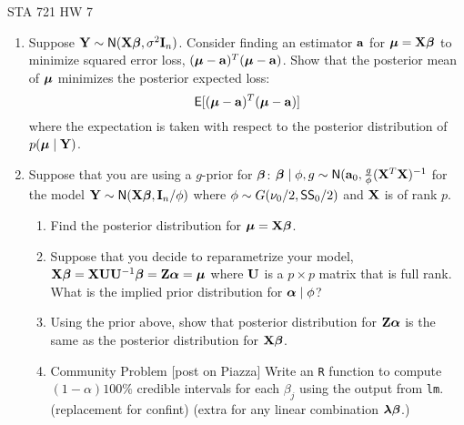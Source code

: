\documentclass{article}
\begin{document}
\begin{center}
  STA 721 HW 7
\end{center}


\begin{enumerate}
\item Suppose $\mathbf{Y} \sim \textsf{N}(\mathbf{X}\boldsymbol{\beta}, \sigma^2 \mathbf{I}_n)$.  Consider finding  an
  estimator $\mathbf{a}$ for $\boldsymbol{\mu} = \mathbf{X}\boldsymbol{\beta}$ to minimize 
  squared error loss, $(\boldsymbol{\mu}- \mathbf{a})^T(\boldsymbol{\mu} - \mathbf{a})$.   Show that the posterior
  mean of $\boldsymbol{\mu}$ minimizes the posterior expected loss:
$$\textsf{E}[(\boldsymbol{\mu}- \mathbf{a})^T(\boldsymbol{\mu} - \mathbf{a})]$$ where the expectation is taken with
respect to the posterior distribution of $p(\boldsymbol{\mu} \mid \mathbf{Y})$.  


\item Suppose that you are using a $g$-prior  for $\boldsymbol{\beta}$:  $\boldsymbol{\beta} \mid
  \phi, g \sim \textsf{N}(\mathbf{a}_0, \frac{g}{\phi} (\mathbf{X}^T\mathbf{X})^{-1}$ for the model
$\mathbf{Y} \sim \textsf{N}(\mathbf{X}\boldsymbol{\beta}, \mathbf{I}_n/\phi)$ where $\phi \sim G(\nu_0/2, \textsf{SS}_0/2)$
and $\mathbf{X}$ is of rank $p$.

\begin{enumerate}
\item  Find the posterior distribution for $\boldsymbol{\mu} = \mathbf{X}\boldsymbol{\beta}$.
\item  Suppose that you decide to reparametrize your model,  $\mathbf{X}\boldsymbol{\beta} =
  \mathbf{X} \mathbf{U} \mathbf{U}^{-1} \boldsymbol{\beta} = \mathbf{Z} \boldsymbol{\alpha} = \boldsymbol{\mu}$ where $\mathbf{U}$ is a $p \times p$
  matrix that is full rank.  What is the implied prior 
  distribution for $\boldsymbol{\alpha} \mid \phi$?  

\item  Using the prior above, show that posterior distribution for $\mathbf{Z} \boldsymbol{\alpha}$ is the same
 as the posterior distribution for $\mathbf{X}\boldsymbol{\beta}$.

\item Community Problem [post on Piazza] Write an {\tt R} function to compute $(1-
  \alpha) 100\%$ credible intervals for each $\beta_j$ using the
  output from {\tt lm}. (replacement for confint)  (extra for any
  linear combination $\boldsymbol{\lambda} \boldsymbol{\beta}$.)

\end{enumerate}

\end{enumerate}
\end{document}
